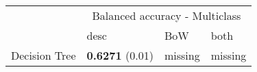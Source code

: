 \begin{tabular}{|l|l|l|l| }
\hline
 &  \multicolumn{3}{c|}{ Balanced accuracy - Multiclass} \\
\cline{2-4} & desc & BoW & both \\ \hline
Decision Tree & {\bf 0.6271} (0.01) & missing  & missing \\
\hline
\end{tabular}